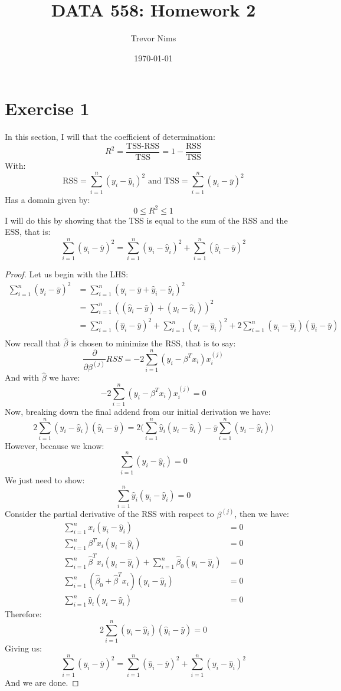 \documentclass{article}
\title{DATA 558: Homework 2}
\author{Trevor Nims}
\date\today
\begin{document}
\maketitle

\section*{Exercise 1}
In this section, I will that the coefficient of determination:
$$R^2 = \frac{\text{TSS-RSS}}{\text{TSS}} = 1 - \frac{\text{RSS}}{\text{TSS}}$$
With:
$$\text{RSS} = \sum_{i=1}^{n}(y_i-\hat{y}_i)^2 \text{ and TSS} = \sum_{i=1}^{n}(y_i-\bar{y})^2$$
Has a domain given by:
$$0 \leq R^2 \leq 1$$
I will do this by showing that the TSS is equal to the sum of the RSS and the ESS, that is:
$$ \sum_{i=1}^{n}(y_i-\bar{y})^2 = \sum_{i=1}^{n}(y_i-\hat{y}_i)^2+\sum_{i=1}^{n}(\hat{y}_i-\bar{y})^2$$
\begin{proof}
Let us begin with the LHS:
\begin{align*}
	\sum_{i=1}^{n}(y_i-\bar{y})^2 &= \sum_{i=1}^{n}(y_i-\bar{y}+\hat{y}_i-\hat{y}_i)^2 \\
	&= \sum_{i=1}^{n}((\hat{y}_i-\bar{y})+(y_i-\hat{y}_i))^2 \\
	&=  \sum_{i=1}^{n}(\hat{y}_i-\bar{y})^2+ \sum_{i=1}^{n}(y_i-\hat{y}_i)^2 +2 \sum_{i=1}^{n}(y_i-\hat{y}_i)(\hat{y}_i-\bar{y}) \\
\end{align*}
Now recall that $\hat{\beta}$ is chosen to minimize the RSS, that is to say:
$$\frac{\partial}{\partial\beta^{(j)}}RSS  =-2\sum_{i=1}^{n}(y_i-\beta^Tx_i)x_i^{(j)}$$
And with $\hat{\beta}$ we have:
$$-2\sum_{i=1}^{n}(y_i-\beta^Tx_i)x_i^{(j)} = 0$$
Now, breaking down the final addend from our initial derivation we have:
$$2 \sum_{i=1}^{n}(y_i-\hat{y}_i)(\hat{y}_i-\bar{y}) = 2\bigg(\sum_{i=1}^{n}\hat{y}_i(y_i-\hat{y}_i)-\bar{y}\sum_{i=1}^{n}(y_i-\hat{y}_i)\bigg)$$
However, because we know:
$$\sum_{i=1}^{n}(y_i-\hat{y}_i) = 0$$
We just need to show:
$$\sum_{i=1}^{n}\hat{y}_i(y_i-\hat{y}_i) = 0$$
Consider the partial derivative of the RSS with respect to $\beta^{(j)}$, then we have:
\begin{align*}
	\sum_{i=1}^{n}x_i(y_i-\hat{y}_i) &= 0 \\
	\sum_{i=1}^{n}\beta^Tx_i(y_i-\hat{y}_i) &= 0 \\
	\sum_{i=1}^{n}\hat{\beta}^Tx_i(y_i-\hat{y}_i) + \sum_{i=1}^{n}\hat{\beta}_0(y_i-\hat{y}_i) &= 0 \\
	\sum_{i=1}^{n}(\hat{\beta}_0+\hat{\beta}^Tx_i)(y_i-\hat{y}_i) &= 0 \\
	\sum_{i=1}^{n}\hat{y}_i(y_i-\hat{y}_i) &= 0
\end{align*}
Therefore:
$$2 \sum_{i=1}^{n}(y_i-\hat{y}_i)(\hat{y}_i-\bar{y}) = 0$$
Giving us:
$$\sum_{i=1}^{n}(y_i-\bar{y})^2 = \sum_{i=1}^{n}(\hat{y}_i-\bar{y})^2+ \sum_{i=1}^{n}(y_i-\hat{y}_i)^2$$
And we are done.
\end{proof}
\end{document}
